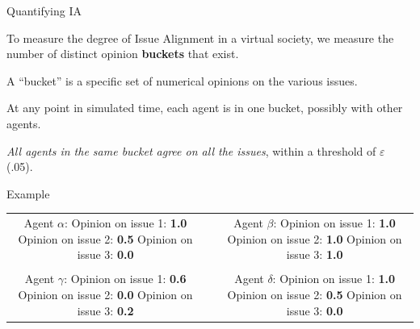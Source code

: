 \documentclass[12pt]{beamer}
\begin{document}
\begin{frame}[c]{Quantifying IA} %

To measure the degree of Issue Alignment in a virtual society, we measure the
number of distinct opinion \textbf{buckets} that exist.

\bigskip
\pause
A ``bucket'' is a specific set of numerical opinions on the various issues.

At any point in simulated time, each agent is in one bucket, possibly with
other agents.

\textit{All agents in the same bucket agree on all the issues}, within a
threshold of $\varepsilon$ (.05).

\end{frame}


\begin{frame}[c]{Example} %

\begin{center}
\begin{tabular}{cp{1cm}c}
\makecell{
\small Agent $\alpha$: \\
\footnotesize Opinion on issue 1: \textbf{1.0} \\
\footnotesize Opinion on issue 2: \textbf{0.5} \\
\footnotesize Opinion on issue 3: \textbf{0.0} \\
} & &
\makecell{
\small Agent $\beta$: \\
\footnotesize Opinion on issue 1: \textbf{1.0} \\
\footnotesize Opinion on issue 2: \textbf{1.0} \\
\footnotesize Opinion on issue 3: \textbf{1.0} \\
} \\
\smallskip \\
\makecell{
\small Agent $\gamma$: \\
\footnotesize Opinion on issue 1: \textbf{0.6} \\
\footnotesize Opinion on issue 2: \textbf{0.0} \\
\footnotesize Opinion on issue 3: \textbf{0.2} \\
} & &
\makecell{
\small Agent $\delta$: \\
\footnotesize Opinion on issue 1: \textbf{1.0} \\
\footnotesize Opinion on issue 2: \textbf{0.5} \\
\footnotesize Opinion on issue 3: \textbf{0.0} \\
} \\
\end{tabular}

\bigskip
\bigskip
\smallskip
{}
\end{center}
\end{frame}
\end{document}

